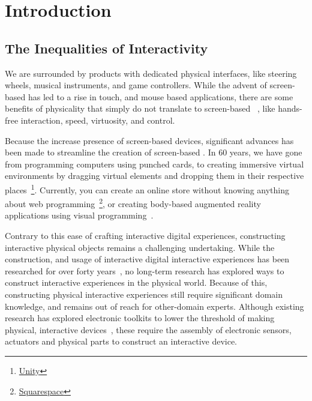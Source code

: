 \chapter{Introduction}
  \section{The Inequalities of Interactivity}
    We are surrounded by products with dedicated physical interfaces, like
    steering wheels, musical instruments, and game controllers. While the advent
    of screen-based  has led to a rise in touch, and mouse based
    applications, there are some benefits of physicality that simply do not
    translate to screen-based ~\cite{klemmer:2006}, like
    hands-free interaction, speed, virtuosity, and control. 

    Because the increase presence of screen-based devices, significant advances
    has been made to streamline the creation of screen-based .  In 60 years, we have gone from programming computers using
    punched cards, to creating immersive virtual environments by dragging
    virtual elements and dropping them in their respective
    places~\footnote{\href{https://unity.com}{Unity}}.  Currently, you can
    create an online store without knowing anything about web
    programming~\footnote{\href{https://www.squarespace.com}{Squarespace}}, or
    creating body-based augmented reality applications using visual
    programming~\cite{Pohl:2020}.

    Contrary to this ease of crafting interactive digital experiences,
    constructing interactive physical objects remains a challenging
    undertaking. While the construction, and usage of interactive digital
    interactive experiences has been researched for over forty
    years~\cite{CHI:, UIST:}, no long-term research has explored ways to
    construct interactive experiences in the physical world. Because of this,
    constructing physical interactive experiences still require significant
    domain knowledge, and remains out of reach for other-domain experts. Although
    existing research has explored electronic toolkits to lower the threshold of
    making physical, interactive devices~\cite{Greenberg:2001, arduino}, these
    require the assembly of electronic sensors, actuators and physical parts to
    construct an interactive device.

